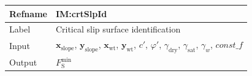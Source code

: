\documentclass[12pt]{article}
\begin{document}
\medskip
\noindent
\begin{minipage}{\textwidth}
\begin{tabular}{>{\raggedright}p{}>{\raggedright\arraybackslash}p{}}
\toprule \textbf{Refname} & \textbf{IM:crtSlpId}
\label{IM:crtSlpId}
\\ \midrule
Label & Critical slip surface identification
        
\\ \midrule
Input & ${\symbf{x}_{\text{slope}}}$, ${\symbf{y}_{\text{slope}}}$, ${\symbf{x}_{\text{wt}}}$, ${\symbf{y}_{\text{wt}}}$, $c'$, $φ'$, ${γ_{\text{dry}}}$, ${γ_{\text{sat}}}$, ${γ_{w}}$, $\mathit{const\_f}$
        
\\ \midrule
Output & ${F^{\text{min}}_{\text{S}}}$
         

\end{tabular}
\end{minipage}
\end{document}
